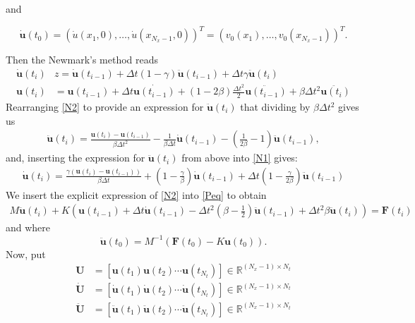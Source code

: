 \documentclass{ws-m3as}
\begin{document}
and

$$
\dot{\mathbf{u}}(t_0) = (\dot{u}(x_1,0),\ldots,\dot{u}(x_{N_x-1},0))^T = (v_0(x_1),\ldots,v_0(x_{N_x-1}))^T.
$$

Then the Newmark's method reads 
\begin{align}
\dot{\mathbf{u}}(t_i) &z = \dot{\mathbf{u}}(t_{i-1}) + \Delta t (1-\gamma) \ddot{\mathbf{u}}(t_{i-1}) + \Delta t \gamma  \ddot{\mathbf{u}}(t_{i}) \label{N1}\\
\mathbf{u}(t_i) & = \mathbf{u}(t_{i-1})+\Delta t  \dot{\mathbf{u}(t_{i-1})}
+(1-2\beta)\frac{\Delta t^2}{2} \ddot{\mathbf{u}(t_{i-1})}+\beta \Delta t^2  \ddot{\mathbf{u}(t_{i})} \label{N2}
\end{align}
Rearranging \eqref{N2} to provide an expression for $ \ddot{\mathbf{u}}(t_{i})$ that dividing by $\beta \Delta t^2$ gives us
\begin{align}
\ddot{\mathbf{u}}(t_{i}) = \frac{\mathbf{u}(t_{i})-\mathbf{u}(t_{i-1})}{\beta \Delta t^2} - \frac{1}{\beta \Delta t} \dot{\mathbf{u}}(t_{i-1})
-\left( \frac{1}{2\beta}-1\right)\ddot{\mathbf{u}}(t_{i-1}), \label{ddot1}
\end{align}
and, inserting the expression for $\ddot{\mathbf{u}}(t_{i})$ from above into \eqref{N1} gives:
\begin{align}
\dot{\mathbf{u}}(t_{i}) = \frac{\gamma(\mathbf{u}(t_{i})-\mathbf{u}(t_{i-1}))}{\beta \Delta t} + \left( 1 - \frac{\gamma}{\beta }\right)  \dot{\mathbf{u}}(t_{i-1})
+\Delta t \left( 1-\frac{\gamma}{2\beta}\right)\ddot{\mathbf{u}}(t_{i-1}) \label{dot1}
\end{align}
We insert the explicit expression of \eqref{N2} into \eqref{Peq} to obtain
\begin{align}
 M \ddot{\mathbf{u}}(t_{i})  + K \left(\mathbf{u}(t_{i-1}) + \Delta t \dot{\mathbf{u}}(t_{i-1})
- \Delta t^2 \left( \beta -\frac{1}{2}\right)\ddot{\mathbf{u}}(t_{i-1}) + \Delta t^2 \beta \ddot{\mathbf{u}}(t_{i}) \right)   = \mathbf{F}(t_{i})\label{newmark}
\end{align}
and where
$$
\ddot{\mathbf{u}}(t_0) = M^{-1}\left( \mathbf{F}(t_0) - K \mathbf{u}(t_0) \right).
$$
Now, put
\begin{align*}
\mathbf{U} & = \left[\mathbf{u}(t_1) \mathbf{u}(t_2) \cdots \mathbf{u}(t_{N_t})\right] \in \mathbb{R}^{(N_x-1) \times N_t} \\
\dot{\mathbf{U}} & = \left[\dot{\mathbf{u}}(t_1) \dot{\mathbf{u}}(t_2) \cdots \dot{\mathbf{u}}(t_{N_t})\right] \in \mathbb{R}^{(N_x-1) \times N_t} \\
\ddot{\mathbf{U}} & = \left[\ddot{\mathbf{u}}(t_1) \ddot{\mathbf{u}}(t_2) \cdots \ddot{\mathbf{u}}(t_{N_t})\right] \in \mathbb{R}^{(N_x-1) \times N_t} 
\end{align*}
\end{document}
